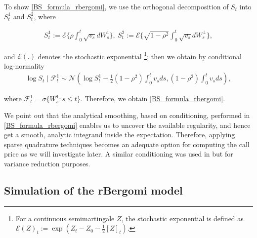 To show \eqref{BS_formula_rbergomi}, we use the orthogonal decomposition of $S_t$ into $S_{t}^1$ and $S_{t}^2$, where

\begin{align*}
	S_t^1:=\mathcal{E}\{ \rho \int_{0}^{t}  \sqrt{v_s} dW_s^1\}, \: S_t^2:= \mathcal{E}\{ \sqrt{1-\rho^2} \int_{0}^{t}  \sqrt{v_s} dW_s^\perp  \}	,
\end{align*}

and $\mathcal{E}(.)$ denotes the stochastic exponential \footnote{For a continuous semimartingale $Z$, the
stochastic exponential is defined as $\mathcal{E}(Z)_t:=\exp\left(Z_t-Z_0- \frac{1}{2} [Z]_t  \right)$.}; then we obtain by conditional log-normality
\begin{align*}
	\log S_t \mid \mathcal{F}_t^1 \sim \mathcal{N}\left( \log S_t^1-\frac{1}{2} (1-\rho^2) \int_{0}^{t} v_s ds , (1-\rho^2) \int_{0}^{t} v_s ds \right),
\end{align*} 

where $\mathcal{F}_t^1= \sigma\{ W_s^1: s\le t\}$. Therefore, we obtain \eqref{BS_formula_rbergomi}.



We point out that the analytical smoothing, based on conditioning, performed in \eqref{BS_formula_rbergomi} enables us to uncover the available regularity, and hence  get a smooth, analytic integrand inside the expectation. Therefore, applying sparse quadrature techniques becomes an adequate option for computing the call price as we will investigate later. A similar conditioning was used in \cite{mccrickerd2017turbocharging} but for variance reduction purposes.

\subsection{Simulation of the rBergomi model}\label{sec:Simulation of the rBergomi model}

